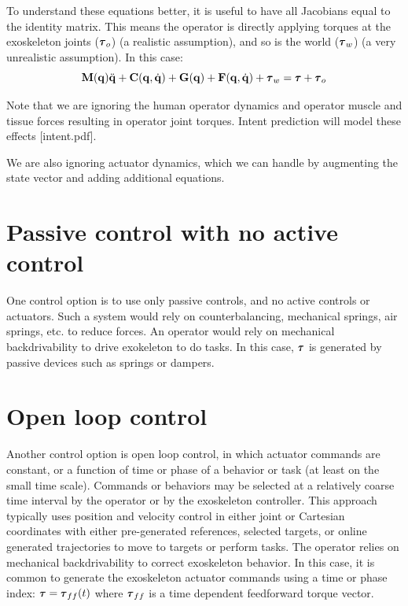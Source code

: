 \documentclass[letterpaper,12pt,fullpage]{article}
\begin{document}
To understand these equations better, it is useful to have all Jacobians equal
to the identity matrix. This means the operator is directly applying torques
at the exoskeleton joints ($\vtau_o$) (a realistic assumption), 
and so is the world ($\vtau_w$) (a very unrealistic assumption). In this case:
\begin{equation}
\mM(\vq) \ddot{\vq} + \mC(\vq,\dot{\vq}) + \mG(\vq) + \mF(\vq,\dot{\vq})
+ \vtau_w = \vtau + \vtau_o
\end{equation}

Note that we are ignoring the human operator dynamics and operator muscle and tissue
forces resulting in operator joint torques. Intent prediction will model these
effects [intent.pdf].

We are also ignoring actuator dynamics, which we can handle by augmenting 
the state vector and adding additional equations.

\section{Passive control with no active control}

One control option is to use only passive controls, and no active controls
or actuators.
Such a system would rely on counterbalancing, mechanical springs, air springs, etc.
to reduce forces. 
An operator would rely on mechanical backdrivability to drive
exokeleton to do tasks.
In this case, 
$\vtau$ is generated by passive devices such as springs or dampers.

\section{Open loop control}

Another control option is open loop control, in which actuator commands are
constant, or a function of time or phase of a behavior or task
(at least on the small time scale).
Commands or behaviors may be selected at a relatively coarse time interval
by the operator or by the exoskeleton controller.
This approach typically 
uses position and velocity control in either joint or
Cartesian coordinates
with either pre-generated references, selected targets,
or online generated trajectories to move to targets or perform tasks.
The operator relies on mechanical backdrivability 
to correct exoskeleton behavior.
In this case, it is common to generate the exoskeleton actuator commands using
a time or phase index:
$\vtau = \vtau_{ff}(t)$ where $\vtau_{ff}$ is a time
dependent feedforward torque vector.
\end{document}
